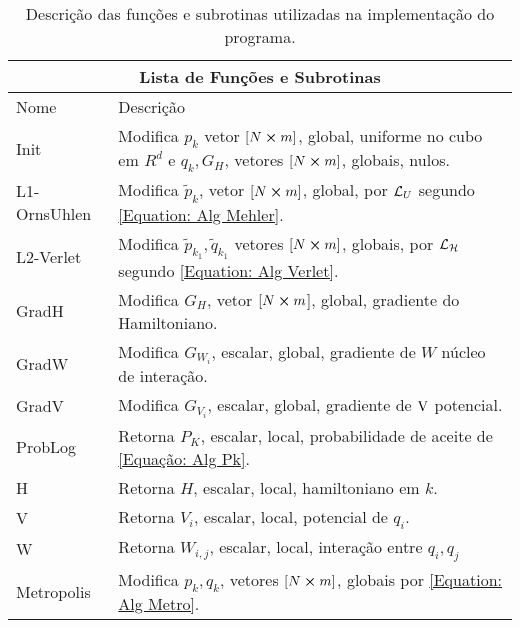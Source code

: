 \begin{table}[ht]
	\centering
	\begin{tabular}{ |p{2.6cm}||p{12cm}|  }
		\hline
		\multicolumn{2}{|c|}{Lista de Funções e Subrotinas} \\
		\hline
		\hline
		Nome & Descrição \\ 
		\hline
		\hline
		Init   		  	 & 
		Modifica ${p}_{k}$ vetor $[N\cross m]$, global, uniforme no cubo em $R^d$ e ${q}_{k}, G_H$, vetores $[N\cross m]$, globais, nulos. \\
		\hline
		L1-OrnsUhlen 	 & 
		Modifica $\tilde{p}_k$, vetor $[N\cross m]$, global, por $\operatorname{\mathcal{L}}_U$ segundo \ref{Equation: Alg Mehler}. \\
		\hline
		L2-Verlet  	 	 & 
		Modifica $\tilde{p}_{k_1},\tilde{q}_{k_1}$ vetores $[N\cross m]$, globais, por $\operatorname{\mathcal{L}}_{\operatorname{\mathcal{H}}}$ segundo \ref{Equation: Alg Verlet}.	\\
		\hline
		GradH         	 & 
		Modifica $G_H$, vetor $[N\cross m$], global, gradiente do Hamiltoniano.					\\
		\hline
		GradW        	 &
		Modifica $G_{W_i}$, escalar, global, gradiente de $W$ núcleo de interação.	\\
		\hline
		GradV  	      	 &
		Modifica $G_{V_i}$, escalar, global, gradiente de $\operatorname{V}$ potencial.		                    \\
		\hline
		ProbLog       		 &
		Retorna $P_K$, escalar, local, probabilidade de aceite de \ref{Equação: Alg Pk}. \\
		\hline
		H              	 &
		Retorna $H$, escalar, local, hamiltoniano em $k$.	 							\\
		\hline
		V  	      			 &
		Retorna $V_i$, escalar, local, potencial de $q_i$.								\\
		\hline
		W         	  		 & 
		Retorna $W_{i,j}$, escalar, local, interação entre $q_i,q_j$ 							\\
		\hline
		Metropolis     	 & 
		Modifica ${p}_{k},{q}_{k}$, vetores $[N\cross m]$, globais por \ref{Equation: Alg Metro}.								\\
		\hline
	\end{tabular}
	\caption{ Descrição das funções e subrotinas utilizadas na implementação do programa.}
	\label{Table: Funcoes e Subrotinas}
\end{table}


